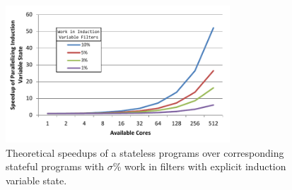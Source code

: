 \begin{figure}[t!]
\includegraphics[width=3.3in]{figures/theoretic-speedup.pdf}
\caption{Theoretical speedups of a stateless programs over corresponding
  stateful programs with $\sigma$\% work in filters with explicit
  induction variable state.  \protect\label{fig:theo-speedups}}
\end{figure}
